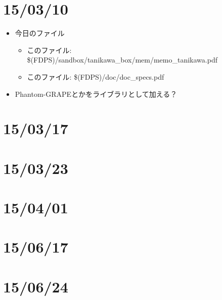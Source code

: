 \documentclass[12pt,a4paper]{jarticle}
\begin{document}
\newpage

\section{15/03/10}

\begin{itemize}
\item 今日のファイル
  \begin{itemize}
  \item このファイル: \$(FDPS)/sandbox/tanikawa\_box/mem/memo\_tanikawa.pdf
  \item このファイル: \$(FDPS)/doc/doc\_specs.pdf
  \end{itemize}
\item Phantom-GRAPEとかをライブラリとして加える？
\end{itemize}

\section{15/03/17}



\section{15/03/23}



\section{15/04/01}



\section{15/06/17}



\section{15/06/24}


\end{document}
